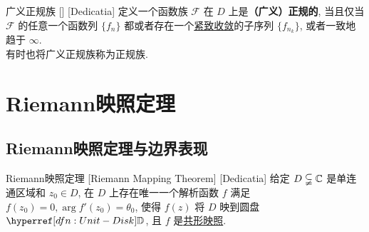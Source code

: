         \begin{dfn}
            {广义正规族}
            []
            [Dedicatia]
            定义一个函数族 \(\mathcal{F}\) 在 \(D\) 上是\textbf{（广义）正规的}, 当且仅当 \(\mathcal{F}\) 的任意一个函数列 \(\{f_n\}\) 都或者存在一个\hyperref[dfn:Compact-Convergence]{紧致收敛}的子序列 \(\{f_{n_k}\}\), 或者一致地趋于 \(\infty\).\\
            有时也将广义正规族称为正规族. 
        \end{dfn}

\section{Riemann映照定理}
    
    \subsection{Riemann映照定理与边界表现}

        \begin{thm}
            {Riemann映照定理}
            [Riemann Mapping Theorem]
            [Dedicatia]
            给定 \(D\subsetneqq\operatorname{\mathbb{C}}\) 是单连通区域和 \(z_0\in D\), 在 \(D\) 上存在唯一一个解析函数 \(f\) 满足 \(f(z_0)=0, \arg f'(z_0)=\theta_0\), 使得 \(f(z)\) 将 \(D\) 映到圆盘 \(\D\), 且 \(f\) 是\hyperref[dfn:Conformal-Mapping]{共形映照}.
        \end{thm}

